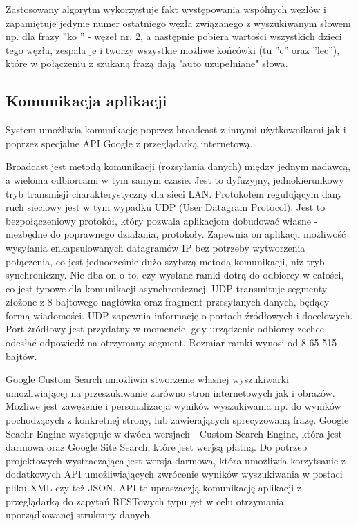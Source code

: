\documentclass[twoside,a4paper]{book}
\begin{document}
Zastosowany algorytm wykorzystuje fakt występowania wspólnych węzłów i zapamiętuje jedynie numer ostatniego węzła związanego z wyszukiwanym słowem np. dla frazy ''ko
'' - węzeł nr. 2, a następnie pobiera wartości wszystkich dzieci tego węzła, zespala je i tworzy wszystkie możliwe końcówki (tu ''c'' oraz ''lec''), które w połączeniu z szukaną frazą dają "auto uzupełniane" słowa.
\subsection{Komunikacja aplikacji}
System umożliwia komunikację poprzez broadcast z innymi użytkownikami jak i poprzez specjalne API Google z przeglądarką internetową. 

Broadcast jest metodą komunikacji (rozsyłania danych) między jednym nadawcą, a wieloma odbiorcami w tym samym czasie. Jest to dyfuzyjny, jednokierunkowy tryb  transmisji charakterystyczny dla sieci LAN. Protokołem regulującym dany ruch sieciowy jest w tym wypadku UDP (User Datagram Protocol). Jest to bezpołączeniowy protokół, który pozwala aplikacjom dobudować własne - niezbędne do poprawnego działania, protokoły. 
Zapewnia on aplikacji możliwość wysyłania enkapsulowanych datagramów IP bez potrzeby wytworzenia połączenia, co jest jednocześnie dużo szybszą metodą komunikacji, niż tryb synchroniczny. Nie dba on o to, czy wysłane ramki dotrą do odbiorcy w całości, co jest typowe dla komunikacji asynchronicznej.
UDP transmituje segmenty złożone z 8-bajtowego nagłówka oraz fragment przesyłanych danych, będący formą wiadomości. 
UDP zapewnia informację o portach źródłowych i docelowych. 
Port źródłowy jest przydatny w momencie, gdy urządzenie odbiorcy zechce odesłać odpowiedź na otrzymany segment.
Rozmiar ramki wynosi od 8-65 515 bajtów. ~\cite{UDP}

Google Custom Search umożliwia stworzenie własnej wyszukiwarki umożliwiającej na przeszukiwanie zarówno stron internetowych jak i obrazów. Możliwe jest zawężenie i personalizacja wyników wyszukiwania np. do wyników pochodzących z konkretnej strony, lub zawierających sprecyzowaną frazę.  Google Seachr Engine występuje w dwóch wersjach - Custom Search Engine, która jest darmowa oraz Google Site Search, które jest werjsą płatną. Do potrzeb projektowych wystraczająca jest wersja darmowa, która umożliwia korzytsanie z dodatkowych API umożliwiających zwrócenie wyników wyszukiwania w postaci pliku XML czy też JSON. API te upraszaczją komunikację aplikacji z przeglądarką do zapytań RESTowych typu get w celu otrzymania uporządkowanej struktury danych. ~\cite{googleAPI}
\end{document}
